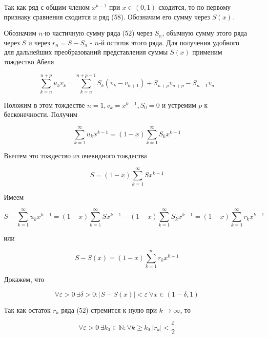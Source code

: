 Так как ряд с общим членом $x^{k - 1}$ при $x \in (0, 1)$ сходится, то по первому признаку сравнения сходится и ряд (58). Обозначим его сумму через $S(x)$.

Обозначим $n$-ю частичную сумму ряда (52) через $S_n$, обычную сумму этого ряда через $S$ и через $r_n = S - S_n$ - $n$-й остаток этого ряда. Для получения удобного для дальнейших преобразований представления суммы $S(x)$ применим тождество Абеля

\begin{equation*}
	\displaystyle\sum_{k = n}^{n + p} u_kv_k = \displaystyle\sum_{k = n}^{n + p - 1} S_k(v_k - v_{k + 1}) + S_{n + p}v_{n + p} - S_{n - 1}v_n
\end{equation*}

Положим в этом тождестве $n = 1, v_k = x^{k - 1}, S_0 = 0$ и устремим $p$ к бесконечности. Получим

\begin{equation*}
	\displaystyle\sum_{k = 1}^\infty u_kx^{k - 1} = (1 - x)\displaystyle\sum_{k = 1}^\infty S_kx^{k - 1}
\end{equation*}

Вычтем это тождество из очевидного тождества

\begin{equation*}
	S = (1 - x)\displaystyle\sum_{k = 1}^\infty Sx^{k - 1}
\end{equation*}

Имеем

\begin{equation*}
	S - \displaystyle\sum_{k = 1}^\infty u_kx^{k - 1} = (1 - x)\displaystyle\sum_{k = 1}^\infty Sx^{k - 1} - (1 - x)\displaystyle\sum_{k = 1}^\infty S_kx^{k - 1} = (1 - x)\displaystyle\sum_{k = 1}^\infty r_kx^{k - 1}
\end{equation*}

или

\begin{equation}
	S - S(x) = (1 - x)\displaystyle\sum_{k = 1}^\infty r_kx^{k - 1}
\end{equation}

Докажем, что

\begin{equation}
	\forall \varepsilon > 0\ \exists \delta > 0\colon |S - S(x)| < \varepsilon\ \forall x \in (1 - \delta, 1)
\end{equation}

Так как остаток $r_k$ ряда (52) стремится к нулю при $k \rightarrow \infty$, то

\begin{equation*}
	\forall \varepsilon > 0\ \exists k_0 \in \mathbb{N}\colon \forall k \geqslant k_0\ |r_k| < \frac{\varepsilon}{2}
\end{equation*}

